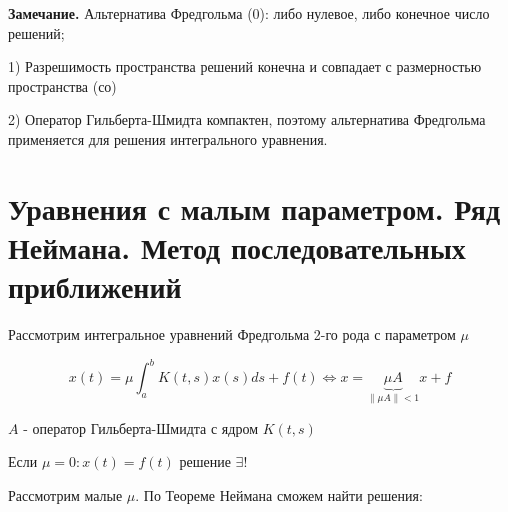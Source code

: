 \documentclass[12pt, a4paper]{report}
\begin{document}
\textbf{Замечание.} Альтернатива Фредгольма (0): либо нулевое, либо конечное число решений; 

1) Разрешимость пространства решений  конечна и совпадает с размерностью пространства (со)

2) Оператор Гильберта-Шмидта компактен, поэтому альтернатива Фредгольма применяется для решения интегрального уравнения.

\section{Уравнения с малым параметром. Ряд Неймана. Метод последовательных приближений}

Рассмотрим интегральное уравнений Фредгольма 2-го рода с параметром \( \mu \) 

\[ x(t ) = \mu \int_{a }^{b }  K (t,s ) x(s ) ds +f (t ) \Leftrightarrow  x = \underbrace{\mu A}_{\left\lVert \mu A  \right\rVert < 1} x +f \]  

\( A \)  - оператор Гильберта-Шмидта с ядром \( K(t,s) \) 

Если \( \mu = 0 : x(t ) = f(t )  \) решение \( \exists !  \) 

Рассмотрим малые \( \mu  \). По Теореме Неймана сможем найти решения: 




\ifdefined\mainfile
\else
    
\end{document}
